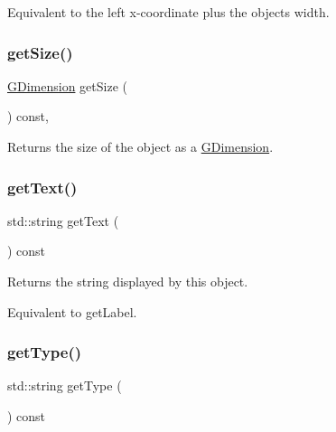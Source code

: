 Equivalent to the left x-\/coordinate plus the object\textquotesingle{}s width. \mbox{\label{classGObject_a7b4eec96a2bdc6420695d5796a78eea9}} 
\subsubsection{\texorpdfstring{get\+Size()}{getSize()}}
{\footnotesize\ttfamily \mbox{\hyperlink{classGDimension}{G\+Dimension}} get\+Size (\begin{DoxyParamCaption}{ }\end{DoxyParamCaption}) const\hspace{0.3cm}{\ttfamily [virtual]}, {\ttfamily [inherited]}}



Returns the size of the object as a {\ttfamily \mbox{\hyperlink{classGDimension}{G\+Dimension}}}. 

\mbox{\label{classGText_aff553c50924b836c29f146ed34a7c6ec}} 
\subsubsection{\texorpdfstring{get\+Text()}{getText()}}
{\footnotesize\ttfamily std\+::string get\+Text (\begin{DoxyParamCaption}{ }\end{DoxyParamCaption}) const\hspace{0.3cm}{\ttfamily [virtual]}}



Returns the string displayed by this object. 

Equivalent to get\+Label. \mbox{\label{classGText_a9896d58fcfebbf1025aeeb5b8b9ede80}} 
\subsubsection{\texorpdfstring{get\+Type()}{getType()}}
{\footnotesize\ttfamily std\+::string get\+Type (\begin{DoxyParamCaption}{ }\end{DoxyParamCaption}) const\hspace{0.3cm}{\ttfamily [virtual]}}



